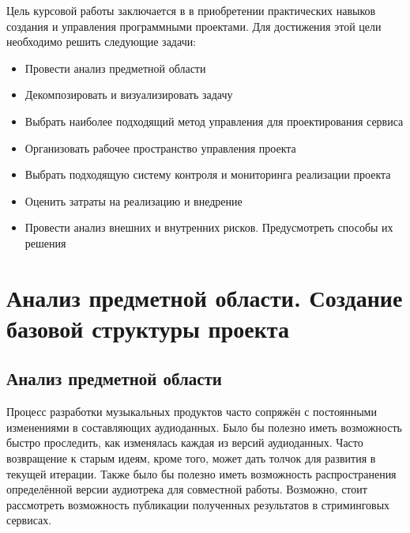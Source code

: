 \documentclass[a4paper,14pt]{extarticle}
\begin{document}
Цель курсовой работы заключается в в приобретении практических навыков создания и 
управления программными проектами. Для достижения этой цели необходимо решить следующие
задачи:

\begin{itemize}
    \item Провести анализ предметной области
    \item Декомпозировать и визуализировать задачу
    \item Выбрать наиболее подходящий метод управления для проектирования сервиса
    \item Организовать рабочее пространство управления проекта
    \item Выбрать подходящую систему контроля и мониторинга реализации проекта
    \item Оценить затраты на реализацию и внедрение
    \item Провести анализ внешних и внутренних рисков. Предусмотреть способы их решения
\end{itemize}

\newpage

\section{Анализ предметной области. Создание базовой структуры проекта}
\subsection{Анализ предметной области}
Процесс разработки музыкальных продуктов часто сопряжён с постоянными изменениями 
в составляющих аудиоданных. Было бы полезно иметь возможность быстро проследить, 
как изменялась каждая из версий аудиоданных. Часто возвращение к старым идеям, 
кроме того, может дать толчок для развития в текущей итерации. Также было бы 
полезно иметь возможность распространения определённой версии аудиотрека для 
совместной работы. Возможно, стоит рассмотреть возможность публикации 
полученных результатов в стриминговых сервисах.
\end{document}
